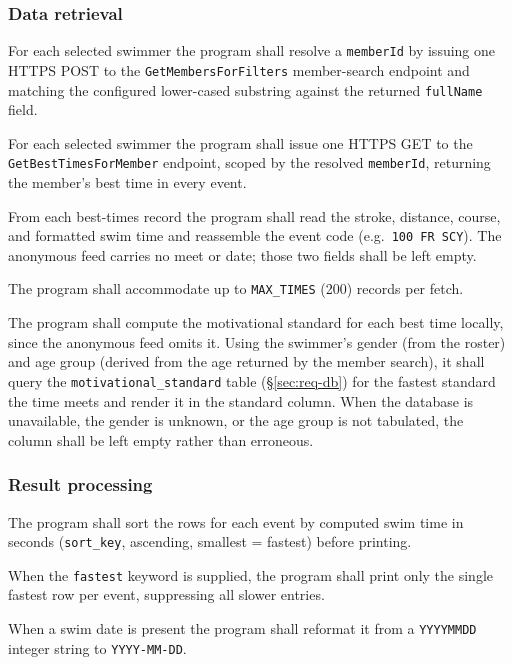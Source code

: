 \documentclass[12pt]{article}
\newcommand{\code}[1]{\texttt{#1}}
\newcommand{\req}[1]{\textbf{[#1]}}
\begin{document}
\subsubsection{Data retrieval}

\begin{description}[style=nextline]
  \item[\req{REQ-F-30}] For each selected swimmer the program
        shall resolve a \code{memberId} by issuing one HTTPS POST
        to the \code{GetMembersForFilters} member-search endpoint and
        matching the configured lower-cased substring against the
        returned \code{fullName} field.
  \item[\req{REQ-F-31}] For each selected swimmer the program
        shall issue one HTTPS GET to the
        \code{GetBestTimesForMember} endpoint, scoped by the
        resolved \code{memberId}, returning the member's best time
        in every event.
  \item[\req{REQ-F-32}] From each best-times record the program
        shall read the stroke, distance, course, and formatted swim
        time and reassemble the event code (e.g.\ \code{100 FR SCY}).
        The anonymous feed carries no meet or date; those two fields
        shall be left empty.
  \item[\req{REQ-F-33}] The program shall accommodate up to
        \code{MAX\_TIMES} (200) records per fetch.
  \item[\req{REQ-F-34}] The program shall compute the motivational
        standard for each best time locally, since the anonymous feed
        omits it.  Using the swimmer's gender (from the roster) and age
        group (derived from the age returned by the member search), it
        shall query the \code{motivational\_standard} table
        (\S\ref{sec:req-db}) for the fastest standard the time meets and
        render it in the standard column.  When the database is
        unavailable, the gender is unknown, or the age group is not
        tabulated, the column shall be left empty rather than erroneous.
\end{description}

\subsubsection{Result processing}

\begin{description}[style=nextline]
  \item[\req{REQ-F-40}] The program shall sort the rows for each
        event by computed swim time in seconds
        (\code{sort\_key}, ascending, smallest = fastest) before
        printing.
  \item[\req{REQ-F-41}] When the \code{fastest} keyword is supplied,
        the program shall print only the single fastest row per
        event, suppressing all slower entries.
  \item[\req{REQ-F-42}] When a swim date is present the program
        shall reformat it from a \code{YYYYMMDD} integer string to
        \code{YYYY-MM-DD}.
\end{description}
\end{document}
